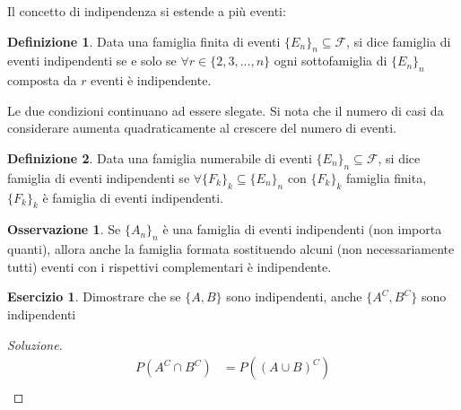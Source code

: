 \documentclass{article}
\theoremstyle{plain}
\theoremstyle{definition}
\newtheorem{definizione}{Definizione}[section]
\newtheorem{osservazione}{Osservazione}[section]
\newtheorem{esercizio}{Esercizio}[section]
\theoremstyle{remark}
\newenvironment{soluzione}
	{\renewcommand\qedsymbol{$\mathwitch*$}\begin{proof}[Soluzione]}
	{\end{proof}}
\renewcommand{\qedsymbol}{$\mathrightghost$}
\begin{document}
Il concetto di indipendenza si estende a più eventi:
\begin{definizione}
	Data una famiglia finita di eventi $\{E_n\}_n\subseteq\mathscr{F}$, si dice famiglia di eventi indipendenti se e solo se $\forall r\in \{2,3,...,n\}$ ogni sottofamiglia di $\{E_n\}_n$ composta da $r$ eventi è indipendente.
\end{definizione}
Le due condizioni continuano ad essere slegate. Si nota che il numero di casi da considerare aumenta quadraticamente al crescere del numero di eventi.
\begin{definizione}
	Data una famiglia numerabile di eventi $\{E_n\}_n\subseteq\mathscr{F}$, si dice famiglia di eventi indipendenti se $\forall \{F_k\}_k\subseteq\{E_n\}_n$ con $\{F_k\}_k$ famiglia finita, $\{F_k\}_k$ è famiglia di eventi indipendenti.
\end{definizione}
\begin{osservazione}
	Se $\{A_n\}_n$ è una famiglia di eventi indipendenti (non importa quanti), allora anche la famiglia formata sostituendo alcuni (non necessariamente tutti) eventi con i rispettivi complementari è indipendente.
\end{osservazione}
\begin{esercizio}
	Dimostrare che se $\{A,B\}$ sono indipendenti, anche $\{A^C,B^C\}$ sono indipendenti
	\begin{soluzione}
		\begin{align*}
			P(A^C\cap B^C)&=P((A\cup B)^C)\\
			&%
		\end{align*}
	\end{soluzione}
\end{esercizio}
\end{document}
